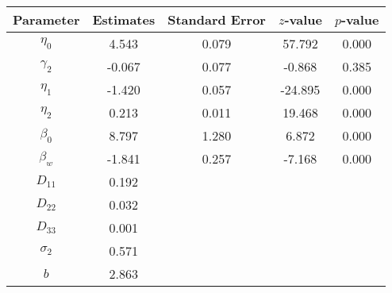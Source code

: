 \begin{table}[ht]
\centering
\begin{tabular}{ccccc}
  \hline
Parameter & Estimates & Standard Error & $z$-value & $p$-value \\ 
  \hline
$\eta_0$ & 4.543 & 0.079 & 57.792 & 0.000 \\ 
  $\gamma_2$ & -0.067 & 0.077 & -0.868 & 0.385 \\ 
  $\eta_1$ & -1.420 & 0.057 & -24.895 & 0.000 \\ 
  $\eta_2$ & 0.213 & 0.011 & 19.468 & 0.000 \\ 
  $\beta_0$ & 8.797 & 1.280 & 6.872 & 0.000 \\ 
  $\beta_w$ & -1.841 & 0.257 & -7.168 & 0.000 \\ 
  $D_{11}$ & 0.192 &  &  &  \\ 
  $D_{22}$ & 0.032 &  &  &  \\ 
  $D_{33}$ & 0.001 &  &  &  \\ 
  $\sigma_2$ & 0.571 &  &  &  \\ 
  $b$ & 2.863 &  &  &  \\ 
   \hline
\end{tabular}
\end{table}
